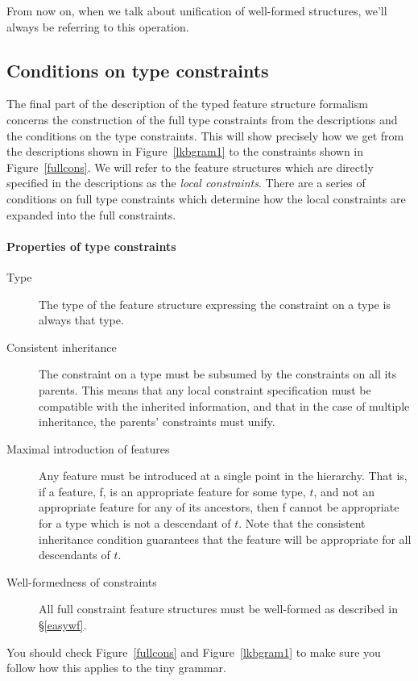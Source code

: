 \documentclass[12pt]{report}
\newcommand{\newterm}[1]{{\it #1}}
\begin{document}
From now on, when we talk about unification of well-formed structures,
we'll always be referring to this operation.

\subsection{Conditions on type constraints}
\label{tc}

The final part of the description
of the typed feature structure formalism
concerns the construction of the 
full type constraints from the descriptions 
and the conditions on the type constraints.
This will show precisely how we get from the
descriptions shown in Figure~\ref{lkbgram1}
to the constraints shown in Figure~\ref{fullcons}.
We will refer to the feature
structures which are directly specified in the descriptions
as the \newterm{local constraints}.
There are a series of conditions on full type constraints
which determine how the local constraints are expanded into the 
full constraints.

\paragraph{Properties of type constraints}
\begin{description}
\item[Type] The type of the feature structure
expressing the constraint on a type is always that type.
\item[Consistent inheritance]
The constraint on a type must be subsumed by the constraints
on all its parents.  This means that any local constraint
specification must be compatible with the inherited
information, and that
in the case of multiple inheritance,
the parents' constraints must unify.
\item[Maximal introduction of features]
Any feature must be introduced at a single point in the hierarchy.
That is, if a feature, {\feature f}, is an appropriate feature
for some type, $t$, and 
not an appropriate feature for any of its
ancestors, then {\feature f} cannot be appropriate for a type which is not
a descendant of $t$.  Note that the consistent inheritance
condition guarantees that the feature will be appropriate
for all descendants of $t$.
\item[Well-formedness of constraints]  All full constraint feature
structures must be well-formed as described in
\S\ref{easywf}.  
\end{description}

You should check Figure~\ref{fullcons} and Figure~\ref{lkbgram1}
to make sure you follow how this applies to the tiny grammar.
\end{document}
